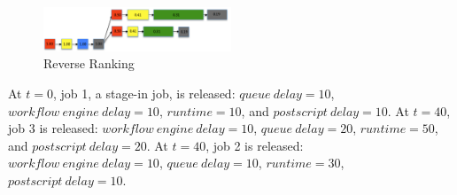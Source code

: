 \documentclass[final,5p,times,twocolumn]{elsarticle}
\begin{document}
\begin{figure}[h!]
	\centering
    \includegraphics[width=0.5\textwidth]{figures/model/rr.pdf}
    \caption{Reverse Ranking}
    \label{fig:model_rr}
\end{figure}

At $t=0$, job 1, a stage-in job, is released: $queue~delay = 10$, $workflow~engine~delay = 10$, $runtime = 10$, and $postscript~delay = 10$.
At $t=40$, job 3 is released: $workflow~engine~delay = 10$, $queue~delay = 20$, $runtime = 50$, and $postscript~delay = 20$.
At $t=40$, job 2 is released: $workflow~engine~delay = 10$, $queue~delay = 10$, $runtime = 30$, $postscript~delay = 10$. 

 



\end{document}

